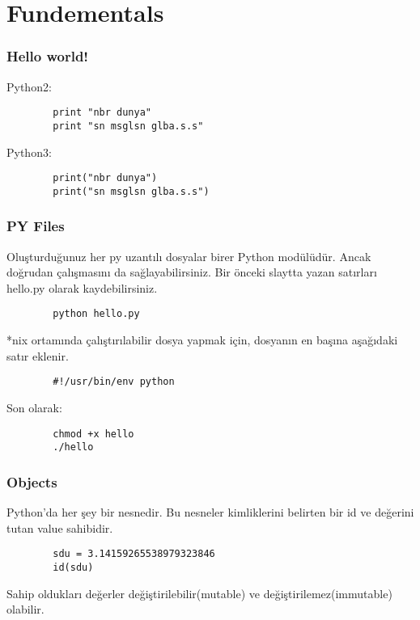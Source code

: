 \documentclass[10pt, compress]{beamer}
\begin{document}
\section{Fundementals}



\begin{frame}[fragile]
\frametitle{Hello world!}
    Python2:
    \begin{verbatim}
        print "nbr dunya"
        print "sn msglsn glba.s.s"
    \end{verbatim} 
    Python3:
    \begin{verbatim}
        print("nbr dunya")
        print("sn msglsn glba.s.s")
    \end{verbatim}      
\end{frame}

\begin{frame}[fragile]
\frametitle{PY Files}
    Oluşturduğunuz her \alert{py} uzantılı dosyalar birer Python modülüdür. Ancak doğrudan çalışmasını da sağlayabilirsiniz. Bir önceki slaytta yazan satırları \alert{hello.py} olarak kaydebilirsiniz.
    \begin{verbatim}
        python hello.py
    \end{verbatim}     
    *nix ortamında çalıştırılabilir dosya yapmak için, dosyanın en başına aşağıdaki satır eklenir.
    \begin{verbatim}
        #!/usr/bin/env python
    \end{verbatim}     
    Son olarak:
    \begin{verbatim}
        chmod +x hello
        ./hello
    \end{verbatim}      
\end{frame}

\begin{frame}[fragile]
\frametitle{Objects}
    Python'da her şey bir nesnedir. Bu nesneler kimliklerini belirten bir \alert{id} ve değerini tutan \alert{value} sahibidir.
    \begin{verbatim}
        sdu = 3.14159265538979323846
        id(sdu)
    \end{verbatim}    
    Sahip oldukları değerler \alert{değiştirilebilir(mutable)} ve \alert{değiştirilemez(immutable)} olabilir.
\end{frame}
\end{document}

